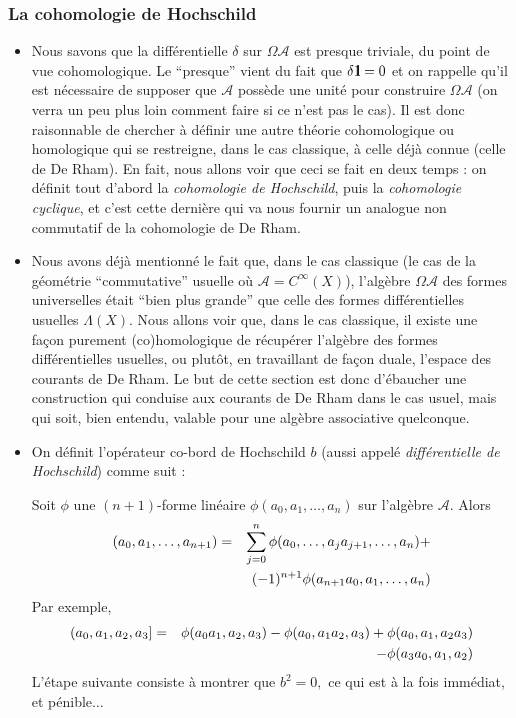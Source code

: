 \subsubsection{La cohomologie de Hochschild} 

\begin{itemize}


	\item  Nous savons que la diff\'erentielle  $\delta $   sur  $\Omega {\mathcal A} $   
est presque triviale, du point de vue cohomologique. Le ``presque'' 
vient du fait que  $\delta \mbox{\rm 1}\hskip-3pt \mbox{\rm l} = 0 $ et on rappelle qu'il est 
n\'ecessaire de supposer que  ${\mathcal A}$ poss\`ede une 
unit\'e pour construire $\Omega {\mathcal A}$ (on
verra un peu plus  loin comment faire si ce n'est
pas le cas). Il est donc  raisonnable de chercher
\`a d\'efinir une autre th\'eorie  cohomologique
ou homologique qui se restreigne, dans le cas 
classique, \`a celle d\'ej\`a connue (celle de De
Rham). En fait,  nous allons voir que ceci se
fait en deux temps : on d\'efinit tout  d'abord
la {\sl cohomologie de Hochschild\/}, puis la
{\sl cohomologie  cyclique\/},  et c'est cette
derni\`ere qui va nous fournir un  analogue non
commutatif de la cohomologie de De Rham.  


	\item   Nous avons d\'ej\`a mentionn\'e le fait que, dans le cas classique (le cas 
 de la g\'eom\'etrie ``commutative'' usuelle o\`u ${\mathcal A} = 
 C^\infty(X)$), l'alg\`ebre $  \Omega {\mathcal A} $  des formes universelles \'etait 
 ``bien plus grande'' que celle des formes diff\'erentielles usuelles $\Lambda(X) $.
 Nous allons voir que, dans le cas classique, il existe une fa\c con purement (co)homologique de 
r\'ecup\'erer l'alg\`ebre des formes diff\'erentielles usuelles, ou plut\^ot, en 
travaillant de fa\c con duale, l'espace des courants de De Rham.
 Le but de cette section est donc d'\'ebaucher une construction qui 
conduise aux courants de De Rham dans le cas usuel, mais qui soit, bien 
entendu, valable pour une alg\`ebre associative quelconque.


\item 
On d\'efinit  l'op\'erateur co-bord de Hochschild $b$ (aussi appel\'e {\sl 
diff\'erentielle de Hochschild\/}) comme suit 
: \par
Soit $\phi$ une $(n+1)$-forme lin\'eaire $  \phi(a_0,a_1,\ldots,a_n) $ 
sur l'alg\`ebre ${\mathcal A}$.  Alors
\begin{eqnarray*}
     [b\phi](a_0,a_1,\ldots,a_{n+1})&=&
\sum_{j=0}^n \phi(a_0,\ldots,a_ja_{j+1},\ldots,a_n) + \cr
{} & {} & (-1)^{n+1} \phi(a_{n+1}a_0,a_1,\ldots,a_n)  
\end{eqnarray*}
Par exemple, 
 \begin{eqnarray*}
[b\phi](a_0,a_1,a_2,a_3]&=&\phi(a_0a_1,a_2,a_3)-\phi(a_0,a_1a_2,a_3)+\phi(a_0,a_1,a_2a_3)\cr
{} & {} & -\phi(a_3a_0,a_1,a_2)
\end{eqnarray*}
L'\'etape suivante consiste \`a montrer que  $  b^2=0 ,$   ce qui est \`a la 
fois imm\'ediat, et p\'enible$\ldots $  
\par  


\end{itemize}
